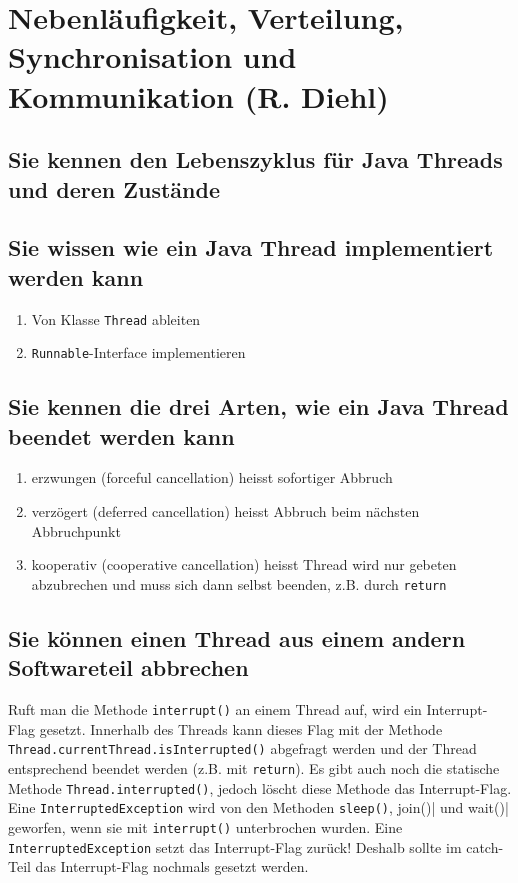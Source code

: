 \section{Nebenläufigkeit, Verteilung, Synchronisation und Kommunikation (R. Diehl)}
\label{sec:diehl}

\subsection{Sie kennen den Lebenszyklus für Java Threads und deren Zustände}


\subsection{Sie wissen wie ein Java Thread implementiert werden kann}

\begin{enumerate}
	\item Von Klasse \verb|Thread| ableiten
	\item \verb|Runnable|-Interface implementieren
\end{enumerate}

\subsection{Sie kennen die drei Arten, wie ein Java Thread beendet werden kann}

\begin{enumerate}
	\item erzwungen (forceful cancellation) heisst sofortiger Abbruch
	\item verzögert (deferred cancellation) heisst Abbruch beim nächsten Abbruchpunkt
	\item kooperativ (cooperative cancellation) heisst Thread wird nur gebeten abzubrechen und muss sich dann selbst beenden, z.B. durch \verb|return|
\end{enumerate}

\subsection{Sie können einen Thread aus einem andern Softwareteil abbrechen}

Ruft man die Methode \verb|interrupt()| an einem Thread auf, wird ein Interrupt-Flag gesetzt. Innerhalb des Threads kann dieses Flag mit der Methode \verb|Thread.currentThread.isInterrupted()| abgefragt werden und der Thread entsprechend beendet werden (z.B. mit \verb|return|). Es gibt auch noch die statische Methode \verb|Thread.interrupted()|, jedoch löscht diese Methode das Interrupt-Flag.
Eine \verb|InterruptedException| wird von den Methoden \verb|sleep()|, \verb||join()| und \verb||wait()| geworfen, wenn sie mit \verb|interrupt()| unterbrochen wurden. Eine \verb|InterruptedException| setzt das Interrupt-Flag zurück! Deshalb sollte im catch-Teil das Interrupt-Flag nochmals gesetzt werden.

